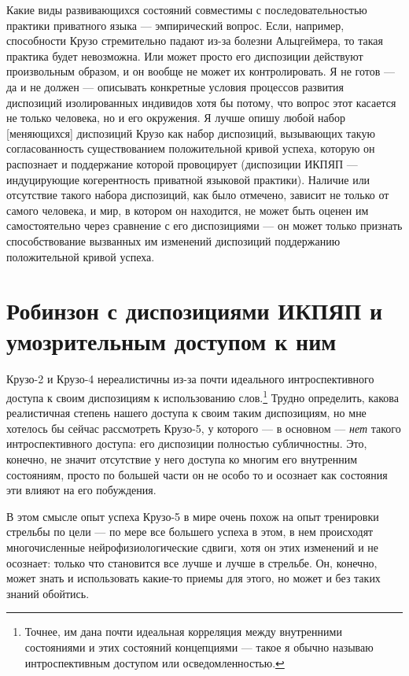 \documentclass[11pt]{book}
\begin{document}
Какие виды развивающихся состояний совместимы с последовательностью практики приватного языка --- эмпирический вопрос. Если, например, способности Крузо стремительно падают из-за болезни Альцгеймера, то такая практика будет невозможна. Или может просто его диспозиции действуют произвольным образом, и он вообще не может их контролировать. Я не готов --- да и не должен --- описывать конкретные условия процессов развития диспозиций изолированных индивидов хотя бы потому, что вопрос этот касается не только человека, но и его окружения. Я лучше опишу любой набор [меняющихся] диспозиций Крузо как набор диспозиций, вызывающих такую согласованность существованием положительной кривой успеха, которую он распознает и поддержание которой провоцирует (диспозиции ИКПЯП --- индуцирующие когерентность приватной языковой практики). Наличие или отсутствие такого набора диспозиций, как было отмечено, зависит не только от самого человека, и мир, в котором он находится, не может быть оценен им самостоятельно через сравнение с его диспозициями --- он может только признать способствование вызванных им изменений диспозиций поддержанию положительной кривой успеха.

\section{Робинзон с диспозициями ИКПЯП и умозрительным доступом к ним}

Крузо-2 и Крузо-4 нереалистичны из-за почти идеального интроспективного доступа к своим диспозициям к использованию слов.\footnote{Точнее, им дана почти идеальная корреляция между внутренними состояниями и этих состояний концепциями --- такое я обычно называю интроспективным доступом или осведомленностью.} Трудно определить, какова реалистичная степень нашего доступа к своим таким диспозициям, но мне хотелось бы сейчас рассмотреть Крузо-5, у которого --- в основном --- \textit{нет} такого интроспективного доступа: его диспозиции полностью субличностны. Это, конечно, не значит отсутствие у него доступа ко многим его внутренним состояниям, просто по большей части он не особо то и осознает как состояния эти влияют на его побуждения.

В этом смысле опыт успеха Крузо-5 в мире очень похож на опыт тренировки стрельбы по цели --- по мере все большего успеха в этом, в нем происходят многочисленные нейрофизиологические сдвиги, хотя он этих изменений и не осознает: только что становится все лучше и лучше в стрельбе. Он, конечно, может знать и использовать какие-то приемы для этого, но может и без таких знаний обойтись.
\end{document}
